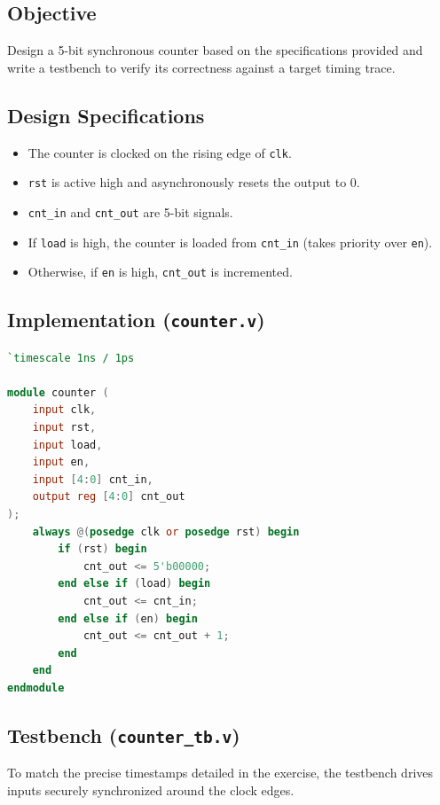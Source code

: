 \documentclass[12pt,a4paper]{article}
\begin{document}
\subsection{Objective}
Design a 5-bit synchronous counter based on the specifications provided and write a testbench to verify its correctness against a target timing trace.

\subsection{Design Specifications}
\begin{itemize}
    \item The counter is clocked on the rising edge of \texttt{clk}.
    \item \texttt{rst} is active high and asynchronously resets the output to 0.
    \item \texttt{cnt\_in} and \texttt{cnt\_out} are 5-bit signals.
    \item If \texttt{load} is high, the counter is loaded from \texttt{cnt\_in} (takes priority over \texttt{en}).
    \item Otherwise, if \texttt{en} is high, \texttt{cnt\_out} is incremented.
\end{itemize}

\subsection{Implementation (\texttt{counter.v})}
\begin{lstlisting}[language=Verilog]
`timescale 1ns / 1ps

module counter (
    input clk,
    input rst,
    input load,
    input en,
    input [4:0] cnt_in,
    output reg [4:0] cnt_out
);
    always @(posedge clk or posedge rst) begin
        if (rst) begin
            cnt_out <= 5'b00000;
        end else if (load) begin
            cnt_out <= cnt_in;
        end else if (en) begin
            cnt_out <= cnt_out + 1;
        end
    end
endmodule
\end{lstlisting}

\subsection{Testbench (\texttt{counter\_tb.v})}
To match the precise timestamps detailed in the exercise, the testbench drives inputs securely synchronized around the clock edges.
\end{document}
